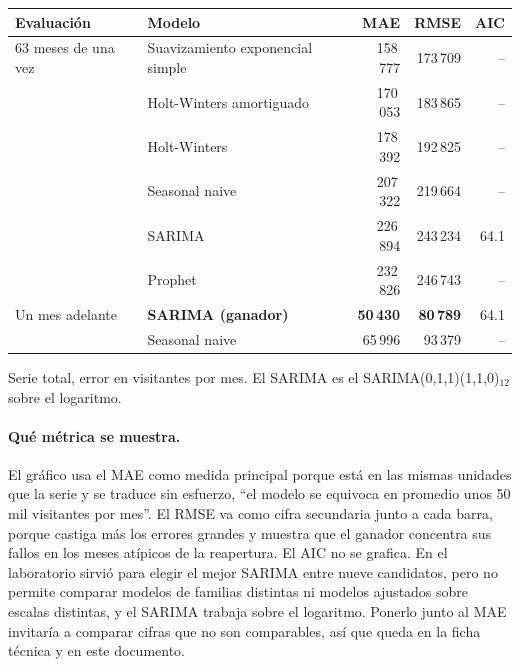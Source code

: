 \begin{center}
\begin{tabular}{@{}llrrr@{}}
\toprule
Evaluación & Modelo & MAE & RMSE & AIC \\
\midrule
63 meses de una vez & Suavizamiento exponencial simple & 158\,777 & 173\,709 & -- \\
                    & Holt-Winters amortiguado         & 170\,053 & 183\,865 & -- \\
                    & Holt-Winters                     & 178\,392 & 192\,825 & -- \\
                    & Seasonal naive                   & 207\,322 & 219\,664 & -- \\
                    & SARIMA                           & 226\,894 & 243\,234 & 64.1 \\
                    & Prophet                          & 232\,826 & 246\,743 & -- \\
\midrule
Un mes adelante     & \textbf{SARIMA (ganador)}        & \textbf{50\,430} & \textbf{80\,789} & 64.1 \\
                    & Seasonal naive                   & 65\,996 & 93\,379 & -- \\
\bottomrule
\end{tabular}

{\footnotesize Serie total, error en visitantes por mes. El SARIMA es el
SARIMA(0,1,1)(1,1,0)$_{12}$ sobre el logaritmo.}
\end{center}

\paragraph{Qué métrica se muestra.} El gráfico usa el MAE como medida principal porque está en
las mismas unidades que la serie y se traduce sin esfuerzo, ``el modelo se equivoca en promedio
unos 50 mil visitantes por mes''. El RMSE va como cifra secundaria junto a cada barra, porque
castiga más los errores grandes y muestra que el ganador concentra sus fallos en los meses
atípicos de la reapertura. El AIC no se grafica. En el laboratorio sirvió para elegir el mejor
SARIMA entre nueve candidatos, pero no permite comparar modelos de familias distintas ni modelos
ajustados sobre escalas distintas, y el SARIMA trabaja sobre el logaritmo. Ponerlo junto al MAE
invitaría a comparar cifras que no son comparables, así que queda en la ficha técnica y en este
documento.

